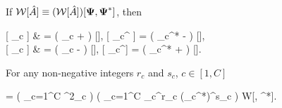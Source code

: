 \begin{theorem}
\label{thm:func-wigner:mc-correspondences}
    If $\mathcal{W} [ \hat{A} ] \equiv (\mathcal{W} [ \hat{A} ]) [\boldsymbol{\Psi}, \boldsymbol{\Psi}^*]$, then
    \begin{eqn*}
    	 [ \Psiop_c  ]
    		& = \left( \Psi_c +   \right) [],
    	\quad
    	 [ \Psiop_c^\dagger {} ]
    		= \left( \Psi_c^* -   \right) [], \\
    	 [  \Psiop_c ]
    		& = \left( \Psi_c -   \right) [],
    	\quad
    	 [  \Psiop_c^\dagger ]
    		= \left( \Psi_c^* +   \right) [].
    \end{eqn*}
\end{theorem}

\begin{theorem}
\label{thm:func-wigner:mc-moments}
	For any non-negative integers $r_c$ and $s_c$, $c \in [1, C]$
	\begin{eqn*}
	    \langle {} \rangle
		= \left( \prod_{c=1}^C \int \delta^2\Psi_c \right)
		\left( \prod_{c=1}^C \Psi_c^{r_c} (\Psi_c^*)^{s_c} \right) W[\Psivec, \Psivec^*].
	\end{eqn*}
\end{theorem}
